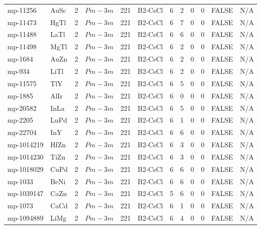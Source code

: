 {\begin{longtable}{llcccccccccc}
    mp-11256 & AuSc  & 2     & $Pm-3m$ & 221   & B2-CsCl & 6     & 2     & 0     & 0     & FALSE & N/A \\
    mp-11473 & HgTl  & 2     & $Pm-3m$ & 221   & B2-CsCl & 6     & 7     & 0     & 0     & FALSE & N/A \\
    mp-11488 & LaTl  & 2     & $Pm-3m$ & 221   & B2-CsCl & 6     & 6     & 0     & 0     & FALSE & N/A \\
    mp-11498 & MgTl  & 2     & $Pm-3m$ & 221   & B2-CsCl & 6     & 2     & 0     & 0     & FALSE & N/A \\
    mp-1684 & AuZn  & 2     & $Pm-3m$ & 221   & B2-CsCl & 6     & 2     & 0     & 0     & FALSE & N/A \\
    mp-934 & LiTl  & 2     & $Pm-3m$ & 221   & B2-CsCl & 6     & 2     & 0     & 0     & FALSE & N/A \\
    mp-11575 & TlY   & 2     & $Pm-3m$ & 221   & B2-CsCl & 6     & 5     & 0     & 0     & FALSE & N/A \\
    mp-1885 & AlIr  & 2     & $Pm-3m$ & 221   & B2-CsCl & 6     & 0     & 0     & 0     & FALSE & N/A \\
    mp-20582 & InLa  & 2     & $Pm-3m$ & 221   & B2-CsCl & 6     & 5     & 0     & 0     & FALSE & N/A \\
    mp-2205 & LuPd  & 2     & $Pm-3m$ & 221   & B2-CsCl & 6     & 1     & 0     & 0     & FALSE & N/A \\
    mp-22704 & InY   & 2     & $Pm-3m$ & 221   & B2-CsCl & 6     & 6     & 0     & 0     & FALSE & N/A \\
    mp-1014219 & HfZn  & 2     & $Pm-3m$ & 221   & B2-CsCl & 6     & 3     & 0     & 0     & FALSE & N/A \\
    mp-1014230 & TiZn  & 2     & $Pm-3m$ & 221   & B2-CsCl & 6     & 3     & 0     & 0     & FALSE & N/A \\
    mp-1018029 & CuPd  & 2     & $Pm-3m$ & 221   & B2-CsCl & 6     & 6     & 0     & 0     & FALSE & N/A \\
    mp-1033 & BeNi  & 2     & $Pm-3m$ & 221   & B2-CsCl & 6     & 6     & 0     & 0     & FALSE & N/A \\
    mp-1039147 & CaZn  & 2     & $Pm-3m$ & 221   & B2-CsCl & 5     & 6     & 0     & 0     & FALSE & N/A \\
    mp-1073 & CaCd  & 2     & $Pm-3m$ & 221   & B2-CsCl & 6     & 1     & 0     & 0     & FALSE & N/A \\
    mp-1094889 & LiMg  & 2     & $Pm-3m$ & 221   & B2-CsCl & 6     & 4     & 0     & 0     & FALSE & N/A \\

\end{longtable}}
